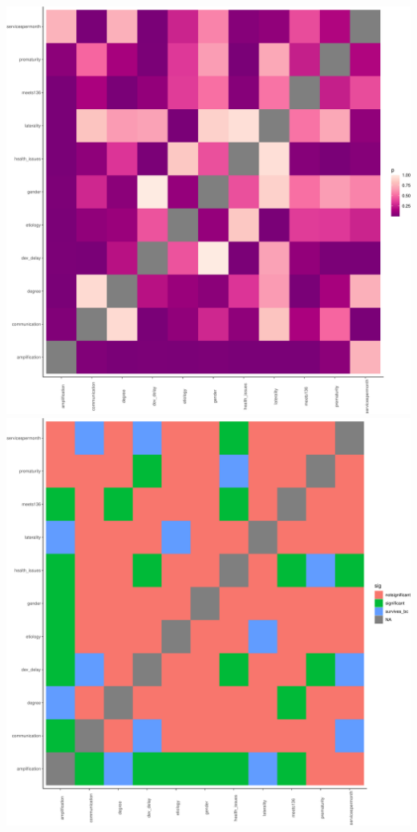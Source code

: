 \documentclass[english,man,floatsintext]{apa6}
\begin{document}
\includegraphics{ELSSP_paper_files/figure-latex/relationships_plot-1.pdf} \includegraphics{ELSSP_paper_files/figure-latex/relationships_plot-2.pdf}
\end{document}
